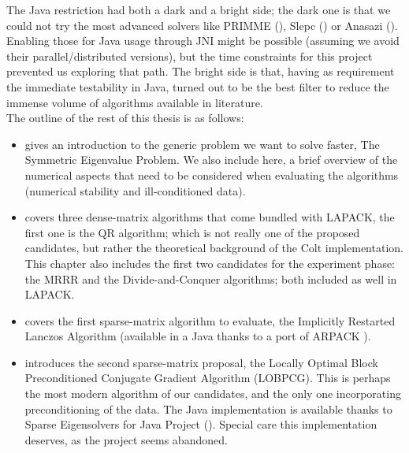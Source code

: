 The Java restriction had both a dark and a bright side; the dark one
is that we could not try the most advanced solvers like PRIMME 
(\cite{primme}), Slepc (\cite{slepc}) or Anasazi (\cite{anasazi}).
Enabling those for Java usage through JNI might be possible (assuming
we avoid their parallel/distributed versions), but the time
constraints for this project prevented us exploring that path. The
bright side is that, having as requirement the immediate testability
in Java, turned out to be the best filter to reduce the immense volume
of algorithms available in literature. \\

The outline of the rest of this thesis is as follows: 

\begin{itemize}
  \item {} gives an introduction to the generic problem
    we want to solve faster, The Symmetric Eigenvalue Problem. We also
    include here, a brief overview of the numerical aspects that need
    to be considered when evaluating the algorithms (numerical
    stability and ill-conditioned data). 

  \item {} covers three dense-matrix algorithms that come bundled with
    LAPACK, the first one is the QR algorithm; which is not really one
    of the proposed candidates, but rather the theoretical background
    of the Colt implementation. This chapter also includes the first two
    candidates for the experiment phase: the MRRR and the
    Divide-and-Conquer algorithms; both included as well in LAPACK. 

  \item {} covers the first sparse-matrix algorithm to
    evaluate, the Implicitly Restarted Lanczos Algorithm (available in
    a Java thanks to a port of ARPACK \cite{arpack}). 

  \item {} introduces the second sparse-matrix proposal,
    the Locally Optimal Block Preconditioned Conjugate Gradient
    Algorithm (LOBPCG). This is perhaps the most modern algorithm of
    our candidates, and
    the only one incorporating preconditioning of the data. The Java
    implementation is available thanks to Sparse Eigensolvers for Java
    Project (\cite{sparseigensolvjava}). Special care this
    implementation deserves, as the project seems abandoned. 


\end{itemize}
